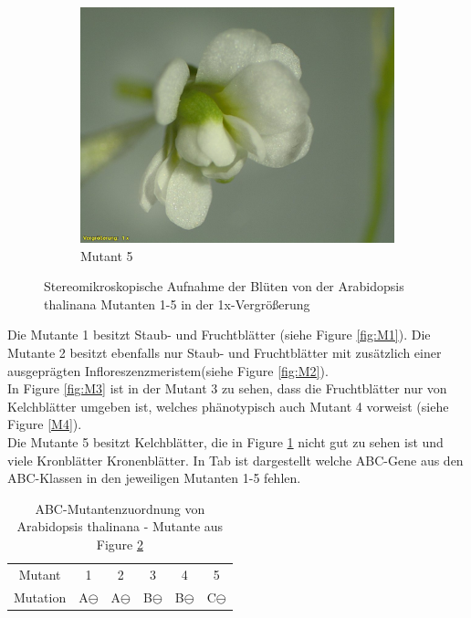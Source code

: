 \documentclass[10pt,a4paper]{article}
\begin{document}
\begin{figure}[H]
\begin{subfigure}[b]{0.45\textwidth}
				\includegraphics[width=\textwidth]{5_O+A(MU).jpg}
				\caption{Mutant 5}
				\label{fig:M5}
			\end{subfigure}
			\caption{Stereomikroskopische Aufnahme der Blüten von der Arabidopsis thalinana Mutanten 1-5 in der 1x-Vergrößerung}
			\label{Mutant}
		\end{figure}
		
		Die Mutante 1 besitzt Staub- und Fruchtblätter (siehe Figure \ref{fig:M1}).
		Die Mutante 2 besitzt ebenfalls nur Staub- und Fruchtblätter mit zusätzlich einer ausgeprägten Infloreszenzmeristem(siehe Figure \ref{fig:M2}).\\
		In Figure \ref{fig:M3} ist in der Mutant 3 zu sehen, dass die Fruchtblätter nur von Kelchblätter umgeben ist, welches phänotypisch auch Mutant 4 vorweist (siehe Figure \ref{M4}).\\
		Die Mutante 5 besitzt Kelchblätter, die in Figure \ref{fig:M5} nicht gut zu sehen ist und viele Kronblätter Kronenblätter.
		In Tab  ist dargestellt welche ABC-Gene aus den ABC-Klassen in den jeweiligen Mutanten 1-5 fehlen.
		
		\begin{table}[H]
			\centering
			\caption{ABC-Mutantenzuordnung von Arabidopsis thalinana - Mutante aus Figure \ref{Mutant}}
			\label{tab:Mutatn ABC}
			\begin{tabular}{cccccc}
				\toprule
				Mutant & 1 & 2 & 3 & 4 & 5\\
		 		Mutation & A$\ominus$ & A$\ominus$ & B$\ominus$ & B$\ominus$ & C$\ominus$ \\

				\bottomrule
			\end{tabular}
		\end{table}
		
\end{document}
